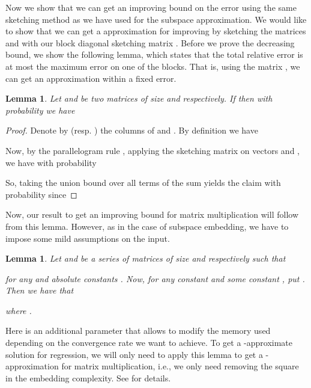\documentclass[a4paper,11pt,oneside,english,onecolumn]{article}
\newtheorem{lemma}[theorem]{Lemma}
\theoremstyle{definition}
\begin{document}
Now we show that we can get an improving bound on the error using the same sketching method as we have used for the subspace approximation. We would like to show that we can get a  approximation for improving  by sketching the matrices  and  with our block diagonal sketching matrix . Before we prove the decreasing bound, we show the following lemma, which states that the total relative error is at most the maximum error on one of the blocks. That is, using the matrix , we can get an approximation within a fixed error.

\begin{lemma}
\label{lemma:simpleMatrixMultiplication}
Let  and  be two matrices of size  and  respectively. If  then with probability  we have 

\end{lemma}

\begin{proof}
Denote by  (resp. ) the columns of  and . By definition we have 

Now, by the parallelogram rule \cite{ArriagaV06}, applying the sketching matrix  on vectors  and , we have with probability 

So, taking the union bound over all terms of the sum yields the claim with probability  since

\end{proof}

Now, our result to get an improving bound for matrix multiplication will follow from this lemma. However, as in the case of subspace embedding, we have to impose some mild assumptions on the input.

\begin{lemma}
\label{lemma:ImprovedmatrixMultiplication}
Let  and  be a series of matrices of size  and  respectively such that

for any  and absolute constants . Now, for any constant  and some constant , put . Then we have that

where .
\end{lemma}

Here  is an additional parameter that allows to modify the memory used depending on the convergence rate we want to achieve. To get a -approximate solution for regression, we will only need to apply this lemma to get a -approximation for matrix multiplication, i.e., we only need  removing the square in the embedding complexity. See \cite{LinAlgStream} for details.
\end{document}
